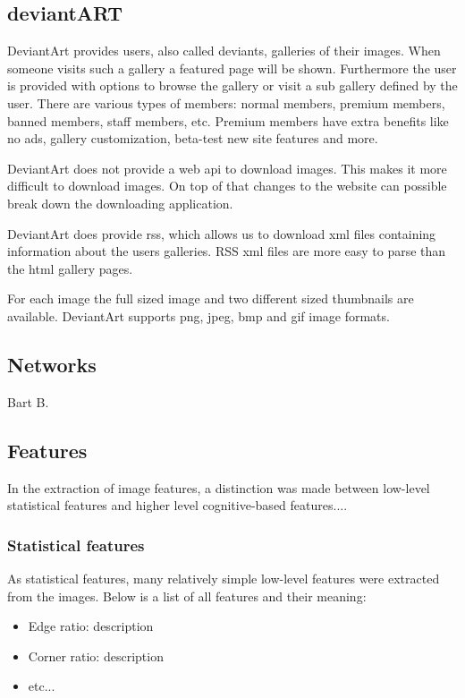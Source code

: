 \subsection{deviantART}
DeviantArt provides users, also called deviants, galleries of their images. 
When someone visits such a gallery a featured page will be shown. Furthermore
the user is provided with options to browse the gallery or visit a sub gallery
defined by the user. There are various types of members: normal members, premium 
members, banned members, staff members, etc. Premium members have extra benefits
like no ads, gallery customization, beta-test new site features and more.

DeviantArt does not provide a web api to download images. This makes it more 
difficult to download images. On top of that changes to the website can possible break
down the downloading application.

DeviantArt does provide rss, which allows us to download xml files containing 
information about the users galleries. RSS xml files are more easy to parse
than the html gallery pages.

For each image the full sized image and two different sized thumbnails are 
available. DeviantArt supports png, jpeg, bmp and gif image formats.

\subsection{Networks}
Bart B.

\subsection{Features}
In the extraction of image features, a distinction was made between low-level statistical features and higher level cognitive-based features....

\subsubsection{Statistical features}
As statistical features, many relatively simple low-level features were extracted from the images. Below is a list of all features and their meaning:
\begin{itemize}
\item Edge ratio: description
\item Corner ratio: description
\item etc...
\end{itemize}
